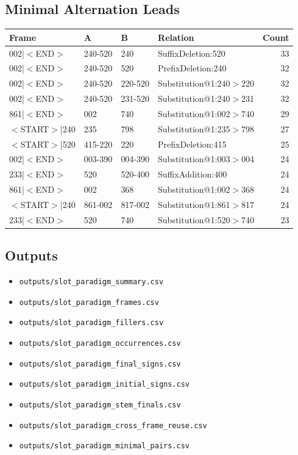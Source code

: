 \documentclass[11pt,a4paper]{article}
\begin{document}
\subsection*{Minimal Alternation Leads}
\begin{center}
\begin{tabular}{llllr}
\toprule
\textbf{Frame} & \textbf{A} & \textbf{B} & \textbf{Relation} & \textbf{Count} \\
\midrule
002|$<$END$>$ & 240-520 & 240 & SuffixDeletion:520 & 33 \\
002|$<$END$>$ & 240-520 & 520 & PrefixDeletion:240 & 32 \\
002|$<$END$>$ & 240-520 & 220-520 & Substitution@1:240$>$220 & 32 \\
002|$<$END$>$ & 240-520 & 231-520 & Substitution@1:240$>$231 & 32 \\
861|$<$END$>$ & 002 & 740 & Substitution@1:002$>$740 & 29 \\
$<$START$>$|240 & 235 & 798 & Substitution@1:235$>$798 & 27 \\
$<$START$>$|520 & 415-220 & 220 & PrefixDeletion:415 & 25 \\
002|$<$END$>$ & 003-390 & 004-390 & Substitution@1:003$>$004 & 24 \\
233|$<$END$>$ & 520 & 520-400 & SuffixAddition:400 & 24 \\
861|$<$END$>$ & 002 & 368 & Substitution@1:002$>$368 & 24 \\
$<$START$>$|240 & 861-002 & 817-002 & Substitution@1:861$>$817 & 24 \\
233|$<$END$>$ & 520 & 740 & Substitution@1:520$>$740 & 23 \\
\bottomrule
\end{tabular}
\end{center}
\subsection*{Outputs}
\begin{itemize}
\item \texttt{outputs/slot\_paradigm\_summary.csv}
\item \texttt{outputs/slot\_paradigm\_frames.csv}
\item \texttt{outputs/slot\_paradigm\_fillers.csv}
\item \texttt{outputs/slot\_paradigm\_occurrences.csv}
\item \texttt{outputs/slot\_paradigm\_final\_signs.csv}
\item \texttt{outputs/slot\_paradigm\_initial\_signs.csv}
\item \texttt{outputs/slot\_paradigm\_stem\_finals.csv}
\item \texttt{outputs/slot\_paradigm\_cross\_frame\_reuse.csv}
\item \texttt{outputs/slot\_paradigm\_minimal\_pairs.csv}
\end{itemize}
\end{document}
